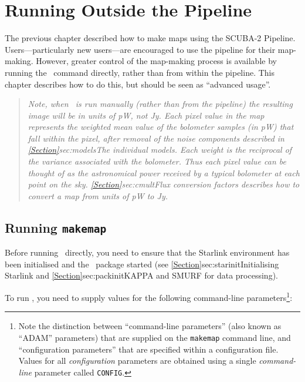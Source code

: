 \chapter{Running  Outside the Pipeline}
\label{sec:manual}

The previous chapter described how to make maps using the SCUBA-2 Pipeline.
Users---particularly new users---are encouraged to use the pipeline for
their map-making. However, greater control of the map-making
process is available by running the \makemap\ command directly, rather
than from within the pipeline. This chapter describes how to do this, but
should be seen as ``advanced usage''.

\begin{quote}
\emph{
Note, when \makemap\ is run manually (rather than from the pipeline) the
resulting image will be in units of pW, not Jy. Each pixel value
in the map represents the weighted mean value of the bolometer samples
(in pW) that fall within the pixel, after removal of the noise components
described in \cref{Section}{sec:models}{The individual models}. Each
weight is the reciprocal of the variance associated with the bolometer.
Thus each pixel value can be thought of as the astronomical power
received by a typical bolometer at each point on the sky.
\cref{Section}{sec:cmult}{Flux conversion factors} describes how to
convert a map from units of pW to Jy.
}
\end{quote}

\section{Running \texttt{makemap}}

Before running \makemap\ directly, you need to ensure that the Starlink
environment has been initialised and the \smurf\ package started (see
\cref{Section}{sec:starinit}{Initialising Starlink} and
\cref{Section}{sec:packinit}{KAPPA and SMURF for data processing}).

To run \makemap, you  need to supply values for the following
command-line parameters\footnote{Note the distinction between
``command-line parameters'' (also known as ``ADAM'' parameters) that are
supplied on the \texttt{makemap} command line, and ``configuration parameters''
that are specified within a configuration file. Values for all
\emph{configuration} parameters are obtained using a single \emph{command-line}
parameter called \texttt{CONFIG}.}:

